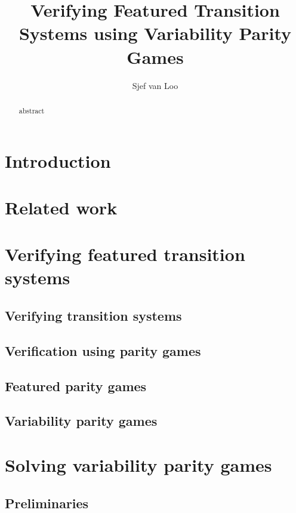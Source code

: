 \documentclass[]{article}
\title{Verifying Featured Transition Systems using Variability Parity Games}
\author{Sjef van Loo}
\begin{document}
\maketitle
\begin{abstract}
	abstract
\end{abstract}

\newpage
\tableofcontents

\pagebreak
\section{Introduction}


\section{Related work}


\pagebreak
\section{Verifying featured transition systems}
\label{part:verifying}

\subsection{Verifying transition systems}


\subsection{Verification using parity games}


\subsection{Featured parity games}


\subsection{Variability parity games}


\pagebreak
\section{Solving variability parity games}


\subsection{Preliminaries}

\end{document}
